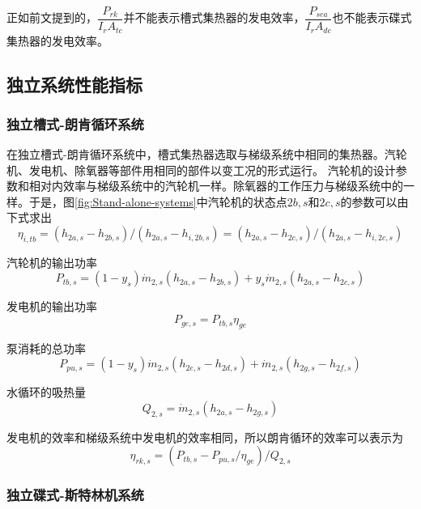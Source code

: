 正如前文提到的，$\dfrac{P_{rk}}{I_rA_{tc}}$并不能表示槽式集热器的发电效率，$\dfrac{P_{sea}}{I_rA_{dc}}$也不能表示碟式集热器的发电效率。

\subsection{独立系统性能指标}

\subsubsection{独立槽式-朗肯循环系统}

在独立槽式-朗肯循环系统中，槽式集热器选取与梯级系统中相同的集热器。汽轮机、发电机、除氧器等部件用相同的部件以变工况的形式运行。
汽轮机的设计参数和相对内效率与梯级系统中的汽轮机一样。除氧器的工作压力与梯级系统中的一样。于是，图\ref{fig:Stand-alone-systems}中汽轮机的状态点$2b,s$和$2c,s$的参数可以由下式求出
\begin{equation}
	\eta_{i,tb}= (h_{2a,s}-h_{2b,s})/(h_{2a,s}-h_{i,2b,s}) = (h_{2a,s}-h_{2c,s})/(h_{2a,s}-h_{i,2c,s})
\end{equation}

汽轮机的输出功率
\begin{equation}
	P_{tb,s}=\left(1-y_{s}\right)\dot{m}_{2,s}\left(h_{2a,s}-h_{2b,s}\right)+y_{s}\dot{m}_{2,s}\left(h_{2a,s}-h_{2c,s}\right)
\end{equation}

发电机的输出功率
\begin{equation}
	P_{ge,s}=P_{tb,s}\eta_{ge}
\end{equation}

泵消耗的总功率
\begin{equation}
	P_{pu,s}=\left(1-y_{s}\right)\dot{m}_{2,s}\left(h_{2e,s}-h_{2d,s}\right)+\dot{m}_{2,s}\left(h_{2g,s}-h_{2f,s}\right)
\end{equation}

水循环的吸热量
\begin{equation}
	Q_{2,s}=\dot{m}_{2,s}\left(h_{2a,s}-h_{2g,s}\right)
\end{equation}

发电机的效率和梯级系统中发电机的效率相同，所以朗肯循环的效率可以表示为
\begin{equation}
	\eta_{rk,s}=(P_{tb,s}-P_{pu,s}/\eta_{ge})/Q_{2,s}
\end{equation}

\subsubsection{独立碟式-斯特林机系统}

